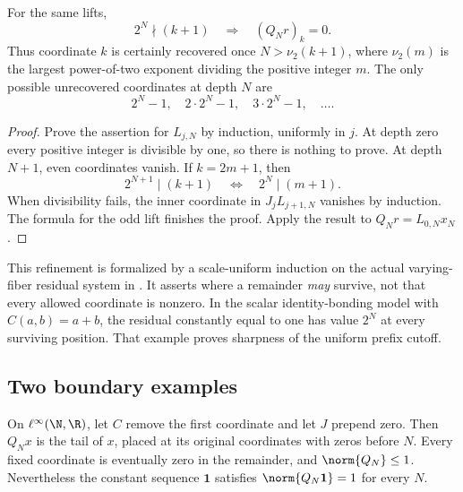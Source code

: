 \begin{proposition}\label{KS55}
For the same lifts,
\[
 2^N\nmid(k+1)\quad\Longrightarrow\quad(Q_Nr)_k=0.
\]
Thus coordinate \(k\) is certainly recovered once \(N>\nu_2(k+1)\), where \(\nu_2(m)\) is the largest power-of-two exponent dividing the positive integer \(m\). The only possible unrecovered coordinates at depth \(N\) are
\[
 2^N-1,\quad 2\cdot2^N-1,\quad3\cdot2^N-1,\quad\ldots.
\]
\end{proposition}
\begin{proof}
Prove the assertion for \(L_{j,N}\) by induction, uniformly in \(j\). At depth zero every positive integer is divisible by one, so there is nothing to prove. At depth \(N+1\), even coordinates vanish. If \(k=2m+1\), then
\[
 2^{N+1}\mid(k+1)\quad\Longleftrightarrow\quad2^N\mid(m+1).
\]
When divisibility fails, the inner coordinate in \(J_jL_{j+1,N}\) vanishes by induction. The formula for the odd lift finishes the proof. Apply the result to \(Q_Nr=L_{0,N}x_N\).
\end{proof}
This refinement is formalized by a scale-uniform induction on the actual varying-fiber residual system in . It asserts where a remainder \emph{may} survive, not that every allowed coordinate is nonzero. In the scalar identity-bonding model with \(C(a,b)=a+b\), the residual constantly equal to one has value \(2^N\) at every surviving position. That example proves sharpness of the uniform prefix cutoff.


\subsection{Two boundary examples}
On \(\ell^\infty(\N,\R)\), let \(C\) remove the first coordinate and let \(J\) prepend zero. Then \(Q_Nx\) is the tail of \(x\), placed at its original coordinates with zeros before \(N\). Every fixed coordinate is eventually zero in the remainder, and \(\norm{Q_N}\le1\). Nevertheless the constant sequence \(\mathbf1\) satisfies \(\norm{Q_N\mathbf1}=1\) for every \(N\).

